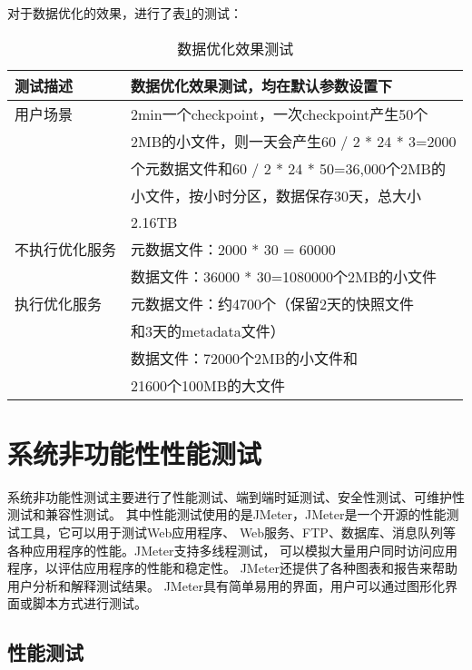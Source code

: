 对于数据优化的效果，进行了表\ref{tab:exampletable15}的测试：

\begin{table}[H]
  \centering
  \caption{数据优化效果测试}
  \label{tab:exampletable15}
  \begin{tabular}{ll}
    \toprule
    测试描述         & 数据优化效果测试，均在默认参数设置下         \\
    \midrule
    用户场景         & 2min一个checkpoint，一次checkpoint产生50个   \\
                   & 2MB的小文件，则一天会产生60 / 2 * 24 * 3=2000   \\
                   & 个元数据文件和60 / 2 * 24 * 50=36,000个2MB的     \\
                   & 小文件，按小时分区，数据保存30天，总大小    \\
                   & 2.16TB              \\
    不执行优化服务         & 元数据文件：2000 * 30 = 60000         \\
                        & 数据文件：36000 * 30=1080000个2MB的小文件         \\
    执行优化服务       & 元数据文件：约4700个（保留2天的快照文件 \\
                     & \hspace{2.2cm}和3天的metadata文件）        \\
                     & 数据文件：72000个2MB的小文件和 \\
                     & \hspace{1.85cm}21600个100MB的大文件        \\
    \bottomrule
  \end{tabular}
\end{table}

\section{系统非功能性性能测试}

系统非功能性测试主要进行了性能测试、端到端时延测试、安全性测试、可维护性测试和兼容性测试。
其中性能测试使用的是JMeter，JMeter是一个开源的性能测试工具，它可以用于测试Web应用程序、
Web服务、FTP、数据库、消息队列等各种应用程序的性能。JMeter支持多线程测试，
可以模拟大量用户同时访问应用程序，以评估应用程序的性能和稳定性。
JMeter还提供了各种图表和报告来帮助用户分析和解释测试结果。
JMeter具有简单易用的界面，用户可以通过图形化界面或脚本方式进行测试。

\subsection{性能测试}

